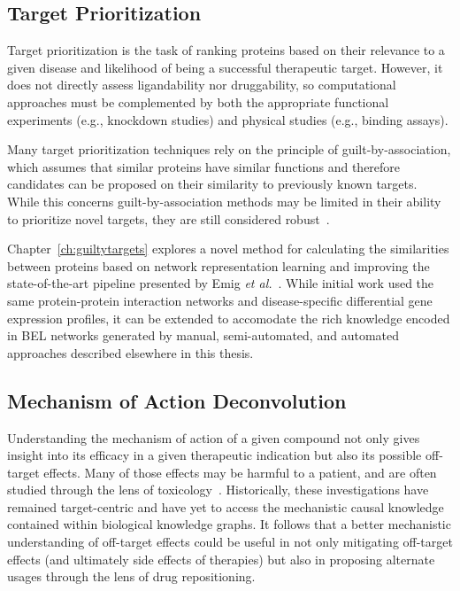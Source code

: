\subsection{Target Prioritization}

Target prioritization is the task of ranking proteins based on their relevance to a given disease and likelihood of being a successful therapeutic target.
However, it does not directly assess ligandability nor druggability, so computational approaches must be complemented by both the appropriate functional experiments (e.g., knockdown studies) and physical studies (e.g., binding assays).

Many target prioritization techniques rely on the principle of guilt-by-association, which assumes that similar proteins have similar functions and therefore candidates can be proposed on their similarity to previously known targets.
While this concerns guilt-by-association methods may be limited in their ability to prioritize novel targets, they are still considered robust~\cite{Moreau2012}.

Chapter~\ref{ch:guiltytargets} explores a novel method for calculating the similarities between proteins based on network representation learning and improving the state-of-the-art pipeline presented by Emig \textit{et al.}~\cite{Emig2013}.
While initial work used the same protein-protein interaction networks and disease-specific differential gene expression profiles, it can be extended to accomodate the rich knowledge encoded in \ac{BEL} networks generated by manual, semi-automated, and automated approaches described elsewhere in this thesis.

\subsection{Mechanism of Action Deconvolution}

Understanding the mechanism of action of a given compound not only gives insight into its efficacy in a given therapeutic indication but also its possible off-target effects.
Many of those effects may be harmful to a patient, and are often studied through the lens of toxicology~\cite{Lee2013}.
Historically, these investigations have remained target-centric and have yet to access the mechanistic causal knowledge contained within biological knowledge graphs.
It follows that a better mechanistic understanding of off-target effects could be useful in not only mitigating off-target effects (and ultimately side effects of therapies) but also in proposing alternate usages through the lens of drug repositioning.

